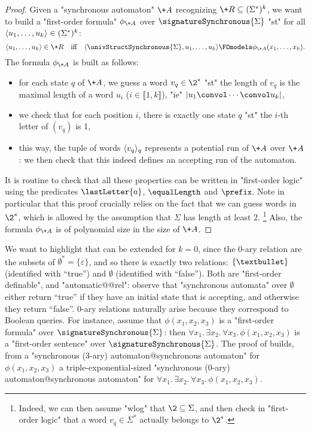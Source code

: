 \begin{proof}
	Given a "synchronous automaton" $\+A$ recognizing $\+R \subseteq (\Sigma^*)^k$,
	we want to build a "first-order formula" $\phi_{\+A}$ over $\signatureSynchronous{\Sigma}$
	"st" for all $\langle u_1,\hdots, u_k\rangle \in (\Sigma^*)^k$:
	\[
		\tup{u_1,\hdots, u_k} \in \+R
		\quad\text{iff}\quad
		\tup{\univStructSynchronous{\Sigma}, u_1,\hdots, u_k} \FOmodels \phi_{\+A}(x_1,\hdots,x_k).
	\]
	The formula $\phi_{\+A}$ is built as follows:
	\begin{itemize}
		\item for each state $q$ of $\+A$, we guess a word $v_q \in \2^*$ "st"
			the length of $v_q$ is the maximal length of a word $u_i$ ($i \in \lBrack 1,k\rBrack$),
			"ie" $|u_1 \convol \cdots \convol u_k|$,
		\item we check that for each position $i$, there is exactly one state $q$
			"st" the $i$-th letter of $(v_q)$ is 1,
		\item this way, the tuple of words $\langle v_q\rangle_{q}$ represents a potential run of $\+A$
			over $\+A$: we then check that this indeed defines an accepting run of the automaton. 
	\end{itemize}
	It is routine to check that all these properties can be written in "first-order logic"
	using the predicates $\lastLetter{a}$, $\equalLength$ and $\prefix$.
	Note in particular that this proof crucially relies on the fact that we can guess words
	in $\2^*$, which is allowed by the assumption that $\Sigma$ has length at least 2.%
	\footnote{Indeed, we can then assume "wlog" that $\2 \subseteq \Sigma$, and then
	check in "first-order logic" that a word $v_q \in \Sigma^*$ actually
	belongs to $\2^*$.}
	Also, the formula $\phi_{\+A}$ is of polynomial size in the size of $\+A$.
\end{proof}

We want to highlight that  can be extended for $k=0$,
since the $0$-ary relation are the subsets of $\emptyset^* = \{\varepsilon\}$,
and so there is exactly two 
relations: $\{\textbullet\}$ (identified with ``true'') and $\emptyset$ (identified with ``false'').
Both are "first-order definable", and "automatic@@rel": observe that "synchronous automata" over
$\emptyset$ either return ``true'' if they have an initial state that is accepting, and otherwise they return ``false''.
$0$-ary relations naturally arise because they correspond to Boolean queries.
For instance, assume that $\phi(x_1,x_2,x_3)$ is a "first-order formula" over
$\signatureSynchronous{\Sigma}$: then
$\forall x_1.\, \exists x_2.\, \forall x_3.\, \phi(x_1,x_2,x_3)$ is a "first-order sentence"
over $\signatureSynchronous{\Sigma}$. The proof of 
builds, from a "synchronous ($3$-ary) automaton@synchronous automaton" for
$\phi(x_1,x_2,x_3)$ a triple-exponential-sized "synchronous ($0$-ary) automaton@synchronous automaton" for $\forall x_1.\, \exists x_2.\, \forall x_3.\, \phi(x_1,x_2,x_3)$.

